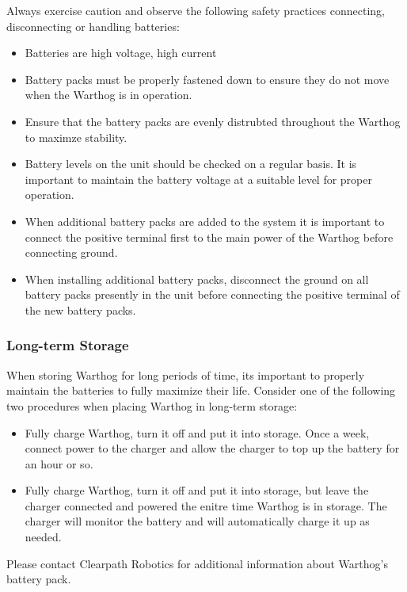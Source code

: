 \documentclass[]{clearpath-latex/clearpath-manual}
\begin{document}
Always exercise caution and observe the following safety practices connecting, disconnecting or handling batteries:

\begin{itemize}[nolistsep]
  \item Batteries are high voltage, high current
  \item Battery packs must be properly fastened down to ensure they do not move when the Warthog is in operation.
  \item Ensure that the battery packs are evenly distrubted throughout the Warthog to maximze stability.
  \item Battery levels on the unit should be checked on a regular basis.  It is important to maintain the battery voltage at a suitable level for proper operation.
  \item When additional battery packs are added to the system it is important to connect the positive terminal first to the main power of the Warthog before connecting ground.
  \item When installing additional battery packs, disconnect the ground on all battery packs presently in the unit before connecting the positive terminal of the new battery packs.
\end{itemize}

\subsubsection{Long-term Storage}

When storing Warthog for long periods of time, its important to properly maintain the batteries to fully maximize their life.  Consider one of the following two procedures when placing Warthog in long-term storage:

\begin{itemize}[nolistsep]
  \item Fully charge Warthog, turn it off and put it into storage.  Once a week, connect power to the charger and allow the charger to top up the battery for an hour or so.
  \item Fully charge Warthog, turn it off and put it into storage, but leave the charger connected and powered the enitre time Warthog is in storage.  The charger will monitor the battery and will automatically charge it up as needed.
\end{itemize}


Please contact Clearpath Robotics for additional information about Warthog's battery pack.
\end{document}
